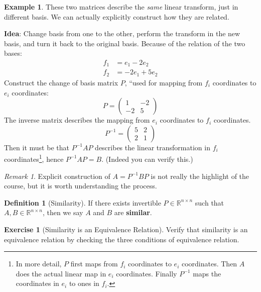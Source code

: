 \documentclass[12pt, a4paper]{article}
\newcommand{\R}{\mathbb{R}}
\theoremstyle{remark}
\newtheorem{remark}{Remark}
\theoremstyle{definition}
\newtheorem{definition}{Definition}
\newtheorem{example}{Example}
\newtheorem{exercise}{Exercise}
\numberwithin{equation}{section}
\numberwithin{definition}{section}
\numberwithin{example}{section}
\numberwithin{exercise}{section}
\numberwithin{remark}{section}
\numberwithin{figure}{section}
\begin{document}
\begin{example}
    These two matrices describe the \textit{same} linear transform, just in different basis.
    We can actually explicitly construct how they are related.

    \textbf{Idea}: Change basis from one to the other, perform the transform in the new basis, and turn it back to the original basis.
    Because of the relation of the two bases:
    \begin{align*}
        f_1 &= e_1 - 2e_2 \\
        f_2 &= -2e_1 + 5e_2
    \end{align*}
    Construct the change of basis matrix $P$, ``used for mapping from $f_i$ coordinates to $e_i$ coordinates:
    \begin{equation*}
        P =
        \begin{pmatrix}
            1 & -2 \\ -2 & 5
        \end{pmatrix}
    \end{equation*}
    The inverse matrix describes the mapping from $e_i$ coordinates to $f_i$ coordinates.
    \begin{equation*}
        P^{-1} =
        \begin{pmatrix}
            5 & 2 \\ 2 & 1
        \end{pmatrix}
    \end{equation*}
    Then it must be that $P^{-1}AP$ describes the linear transformation in $f_i$ coordinates\footnote{
        In more detail, $P$ first maps from $f_i$ coordinates to $e_i$ coordinates.
        Then $A$ does the actual linear map in $e_i$ coordinates.
        Finally $P^{-1}$ maps the coordinates in $e_i$ to ones in $f_i$.
    },
    hence $P^{-1}AP = B$.
    (Indeed you can verify this.)
\end{example}
\begin{remark}
    Explicit construction of $A = P^{-1}BP$ is not really the highlight of the course,
    but it is worth understanding the process.
\end{remark}
\begin{definition}[Similarity]
    If there exists invertible $P\in\R^{n \times n}$ such that $A,B \in \R^{n \times n}$,
    then we say $A$ and $B$ are \textbf{similar}.
\end{definition}
\begin{exercise}[Similarity is an Equivalence Relation]
    Verify that similarity is an equivalence relation by checking the three conditions of equivalence relation.
\end{exercise}
\end{document}
